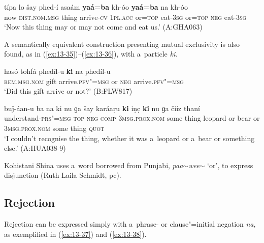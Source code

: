 \begin{exe}
\ex
\label{ex:13-34}
\gll típa lo šay phed-í asaám {\ob}\textbf{yaá=ba} kh-óo \textbf{yaá=ba} na kh-óo{\cb} \\
now \textsc{dist.nom.msg} thing arrive-\textsc{cv} \textsc{1pl.acc} or=\textsc{top} eat-\textsc{3sg} or=\textsc{top} \textsc{neg} eat-\textsc{3sg} \\
\glt `Now this thing may or may not come and eat us.' (A:GHA063) 
\end{exe}

 A semantically equivalent construction presenting mutual exclusivity is also found, as in (\ref{ex:13-35})--(\ref{ex:13-36}), with a~particle \textit{ki}. 

\begin{exe}
\ex
\label{ex:13-35}
\gll hasó tohfá {\ob}phedíl-u \textbf{ki} na phedíl-u{\cb}\\
\textsc{rem.msg.nom} gift arrive.\textsc{pfv"=msg} or \textsc{neg}  arrive.\textsc{pfv"=msg} \\
\glt `Did this gift arrive or not?' (B:FLW817)

\ex
\label{ex:13-36}
\gll buǰ-áan-u ba na ki nu ɡa šay {\ob}karáaṛu \textbf{ki} iṇc̣ \textbf{ki} nu ɡa čiíz{\cb} thaní \\
understand-\textsc{prs"=msg} \textsc{top} \textsc{neg} \textsc{comp} \textsc{3msg.prox.nom}  some thing leopard or bear or \textsc{3msg.prox.nom} some thing \textsc{quot} \\
\glt `I couldn't recognise the thing, whether it was a~leopard or a~bear or something else.' (A:HUA038-9) 
\end{exe}

Kohistani Shina uses a~word borrowed from Punjabi, \textit{paa$\sim$wee$\sim$} `or', to express disjunction (Ruth Laila Schmidt, pc).


\subsection{Rejection}
\label{subsec:13-2-4}

 Rejection can be expressed simply with a~phrase- or clause"=initial negation \textit{na}, as exemplified in (\ref{ex:13-37}) and (\ref{ex:13-38}).

